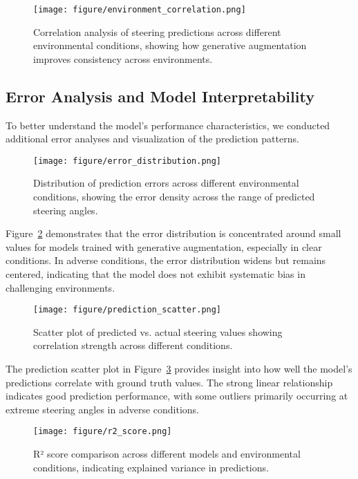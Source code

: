 \documentclass[pdflatex,sn-mathphys-num]{sn-jnl}%
\theoremstyle{thmstyleone}%
\theoremstyle{thmstyletwo}%
\theoremstyle{thmstylethree}%
\begin{document}
\begin{figure}[h]
\centering
\texttt{[image: figure/environment\_correlation.png]}
\caption{Correlation analysis of steering predictions across different environmental conditions, showing how generative augmentation improves consistency across environments.}\label{fig9}
\end{figure}

\subsection{Error Analysis and Model Interpretability}
To better understand the model's performance characteristics, we conducted additional error analyses and visualization of the prediction patterns.

\begin{figure}[h]
\centering
\texttt{[image: figure/error\_distribution.png]}
\caption{Distribution of prediction errors across different environmental conditions, showing the error density across the range of predicted steering angles.}\label{fig6}
\end{figure}

Figure~\ref{fig6} demonstrates that the error distribution is concentrated around small values for models trained with generative augmentation, especially in clear conditions. In adverse conditions, the error distribution widens but remains centered, indicating that the model does not exhibit systematic bias in challenging environments.

\begin{figure}[h]
\centering
\texttt{[image: figure/prediction\_scatter.png]}
\caption{Scatter plot of predicted vs. actual steering values showing correlation strength across different conditions.}\label{fig7}
\end{figure}

The prediction scatter plot in Figure~\ref{fig7} provides insight into how well the model's predictions correlate with ground truth values. The strong linear relationship indicates good prediction performance, with some outliers primarily occurring at extreme steering angles in adverse conditions.

\begin{figure}[h]
\centering
\texttt{[image: figure/r2\_score.png]}
\caption{R² score comparison across different models and environmental conditions, indicating explained variance in predictions.}\label{fig8}
\end{figure}
\end{document}
